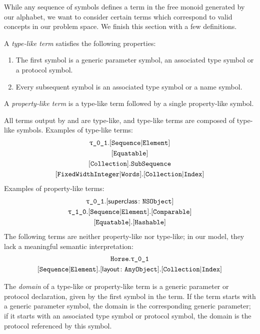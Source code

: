 \documentclass[../generics]{subfiles}
\begin{document}
While any sequence of symbols defines a term in the free monoid generated by our alphabet, we want to consider certain terms which correspond to valid concepts in our problem space. We finish this section with a few definitions.
\begin{definition}
%
%
A \emph{type-like term} satisfies the following properties:
\begin{enumerate}
\item The first symbol is a generic parameter symbol, an associated type symbol or a protocol symbol.
\item Every subsequent symbol is an associated type symbol or a name symbol.
\end{enumerate}
A \emph{property-like term} is a type-like term followed by a single property-like symbol.
\end{definition}
All terms output by  and  are type-like, and type-like terms are composed of type-like symbols.  Examples of type-like terms:
\begin{gather*}
\ttgp{0}{1}.\assocsym{Sequence}{Element}\\
\protosym{Equatable}\\
\protosym{Collection}.\texttt{SubSequence}\\
\assocsym{FixedWidthInteger}{Words}.\assocsym{Collection}{Index}
\end{gather*}
Examples of property-like terms:
\begin{gather*}
\ttgp{0}{1}.\supersym{\texttt{NSObject}}\\
\ttgp{1}{0}.\assocsym{Sequence}{Element}.\protosym{Comparable}\\
\protosym{Equatable}.\protosym{Hashable}
\end{gather*}
The following terms are neither property-like nor type-like; in our model, they lack a meaningful semantic interpretation:
\begin{gather*}
\texttt{Horse}.\ttgp{0}{1}\\
\assocsym{Sequence}{Element}.\layoutsym{AnyObject}.\assocsym{Collection}{Index}
\end{gather*}

\begin{definition}
%
The \emph{domain} of a type-like or property-like term is a generic parameter or protocol declaration, given by the first symbol in the term. If the term starts with a generic parameter symbol, the domain is the corresponding generic parameter; if it starts with an associated type symbol or protocol symbol, the domain is the protocol referenced by this symbol.
\end{definition}
\end{document}
